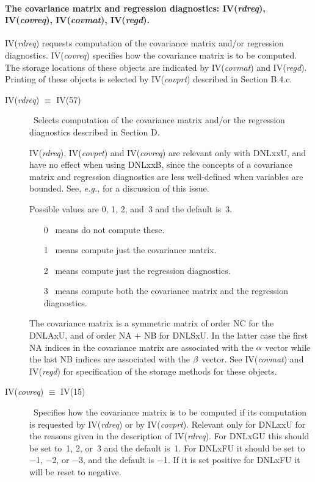 \documentclass[twoside]{MATH77}
\begin{document}
\paragraph{The covariance matrix and regression diagnostics: IV({\em rdreq}),
IV({\em covreq}), IV({\em covmat}), IV({\em regd}).}

IV({\em rdreq}) requests computation of the covariance matrix and/or regression
diagnostics. IV({\em covreq}) specifies how the covariance matrix is to be
computed. The storage locations of these objects are indicated by IV({\em covmat})
and IV({\em regd}). Printing of these objects is selected by IV({\em covprt}) described
in Section B.4.c.
\begin{description}
\item[IV({\em rdreq}) $\equiv $ IV(57)]  \ Selects computation of the covariance
matrix and/or the regression diagnostics described in Section D.

IV({\em rdreq}), IV({\em covprt}) and IV({\em covreq}) are relevant only
with DNLxxU, and have no effect when using DNLxxB, since the concepts of a
covariance matrix and regression diagnostics are less well-defined when
variables are bounded.  See, {\em e.g.}, \cite[pp~180--183]{Bard:1974:NPE}
for a discussion of this issue.

Possible values are 0, 1, 2, and~3 and the default is~3.
\begin{itemize}
\item[0]  \ means do not compute these.

\item[1]  \ means compute just the covariance matrix.

\item[2]  \ means compute just the regression diagnostics.

\item[3]  \ means compute both the covariance matrix and the regression
diagnostics.
\end{itemize}
The covariance matrix is a symmetric matrix of order NC for the DNLAxU, and
of order NA + NB for DNLSxU. In the latter case the first NA indices in the
covariance matrix are associated with the ${\bf \alpha }$ vector while the
last NB indices are associated with the ${\bf \beta }$ vector. See
IV({\em covmat}) and IV({\em regd}) for specification of the storage methods for these
objects.

\item[IV({\em covreq}) $\equiv $ IV(15)]  \ Specifies how the covariance matrix is to be computed if
its computation is requested by IV({\em rdreq}) or by IV({\em covprt}).  Relevant
only for DNLxxU for the reasons given in the description of IV({\em rdreq}).
For DNLxGU this should be set to~1, 2, or~3 and the default is~1. For
DNLxFU it should be set to $-$1, $-$2, or $-$3, and the default is $-$1.
If it is set positive for DNLxFU it will be reset to negative.


\end{description}
\end{document}
